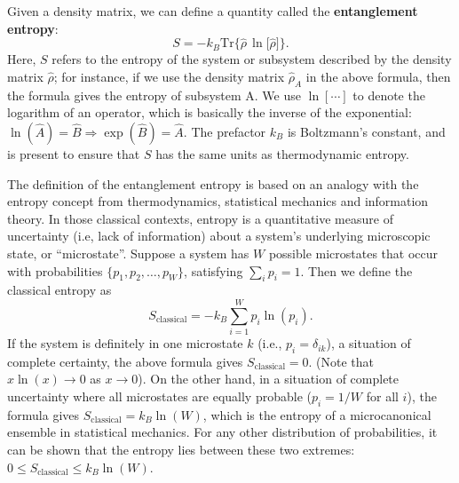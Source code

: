 \documentclass[pra,11pt]{revtex4}
\begin{document}
Given a density matrix, we can define a quantity called the
\textbf{entanglement entropy}:
$$S = - k_B \mathrm{Tr} \Big\{ \hat{\rho}\, \ln\!\big[\hat{\rho}\big] \Big\}.$$
Here, $S$ refers to the entropy of the system or subsystem described
by the density matrix $\hat{\rho}$; for instance, if we use the
density matrix $\hat{\rho}_A$ in the above formula, then the formula
gives the entropy of subsystem A.  We use $\ln[\cdots]$ to denote the
logarithm of an operator, which is basically the inverse of the
exponential: $\ln(\hat{A}) = \hat{B} \Rightarrow \exp(\hat{B}) =
\hat{A}$.  The prefactor $k_B$ is Boltzmann's constant, and is present
to ensure that $S$ has the same units as thermodynamic entropy.

The definition of the entanglement entropy is based on an analogy with
the entropy concept from thermodynamics, statistical mechanics and
information theory.  In those classical contexts, entropy is a
quantitative measure of uncertainty (i.e, lack of information)
about a system's underlying microscopic state, or ``microstate''.
Suppose a system has $W$ possible microstates that occur with
probabilities $\{p_1, p_2, \dots, p_W\}$, satisfying $\sum_i p_i = 1$.
Then we define the classical entropy as
$$S_{\mathrm{classical}} = - k_B \sum_{i=1}^W p_i \ln(p_i).$$
If the system is definitely in one microstate $k$ (i.e., $p_i =
\delta_{ik}$), a situation of complete certainty, the above formula
gives $S_{\mathrm{classical}} = 0$.  (Note that $x \ln(x)\rightarrow
0$ as $x\rightarrow 0$).  On the other hand, in a situation of
complete uncertainty where all microstates are equally probable ($p_i
= 1/W$ for all $i$), the formula gives $S_{\mathrm{classical}} = k_B
\ln(W)$, which is the entropy of a microcanonical ensemble in
statistical mechanics.  For any other distribution of probabilities,
it can be shown that the entropy lies between these two extremes: $0
\le S_{\mathrm{classical}} \le k_B\ln(W)$.
\end{document}
